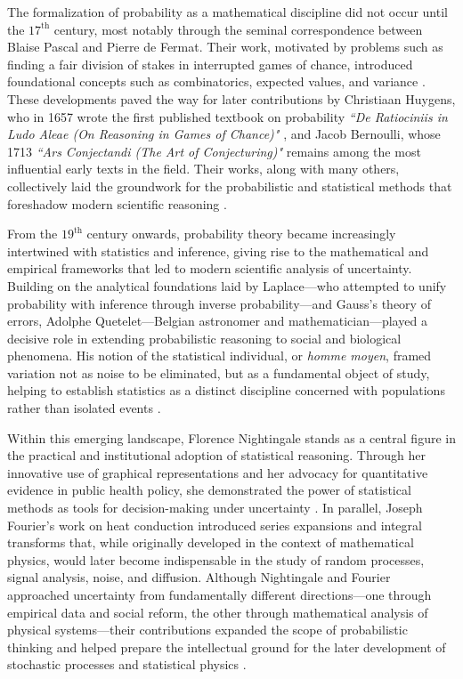 \medskip

The formalization of probability as a mathematical discipline did not occur until the $17^{\text{th}}$ century, most notably through the seminal correspondence between Blaise Pascal and Pierre de Fermat. Their work, motivated by problems such as finding a fair division of stakes in interrupted games of chance, introduced foundational concepts such as combinatorics, expected values, and variance \cite{devlin_2008_unfinished}. These developments paved the way for later contributions by Christiaan Huygens, who in 1657 wrote the first published textbook on probability \textit{``De Ratiociniis in Ludo Aleae (On Reasoning in Games of Chance)"} \cite{huygens_1657_ratiociniis}, and Jacob Bernoulli, whose 1713 \textit{``Ars Conjectandi (The Art of Conjecturing)"} remains among the most influential early texts in the field. Their works, along with many others, collectively laid the groundwork for the probabilistic and statistical methods that foreshadow modern scientific reasoning \cite{bernoulli_1713_ars, hald_1990_history}.

\medskip

From the $19^{\text{th}}$ century onwards, probability theory became increasingly intertwined with statistics and inference, giving rise to the mathematical and empirical frameworks that led to modern scientific analysis of uncertainty. Building on the analytical foundations laid by Laplace—who attempted to unify probability with inference through inverse probability—and Gauss’s theory of errors, Adolphe Quetelet—Belgian astronomer and mathematician—played a decisive role in extending probabilistic reasoning to social and biological phenomena. His notion of the statistical individual, or \textit{homme moyen}, framed variation not as noise to be eliminated, but as a fundamental object of study, helping to establish statistics as a distinct discipline concerned with populations rather than isolated events \cite{gauss_1809_theoria, laplace_1812_theorie, quetelet_1835_homme}.

Within this emerging landscape, Florence Nightingale stands as a central figure in the practical and institutional adoption of statistical reasoning. Through her innovative use of graphical representations and her advocacy for quantitative evidence in public health policy, she demonstrated the power of statistical methods as tools for decision-making under uncertainty \cite{nightingale_1858_notes}. In parallel, Joseph Fourier’s work on heat conduction introduced series expansions and integral transforms that, while originally developed in the context of mathematical physics, would later become indispensable in the study of random processes, signal analysis, noise, and diffusion. Although Nightingale and Fourier approached uncertainty from fundamentally different directions—one through empirical data and social reform, the other through mathematical analysis of physical systems—their contributions expanded the scope of probabilistic thinking and helped prepare the intellectual ground for the later development of stochastic processes and statistical physics \cite{khinchin_1934_correlation, wiener_1930_generalized}.

